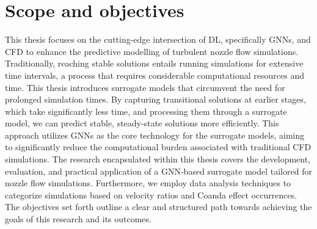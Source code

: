 \section{Scope and objectives}
This thesis focuses on the cutting-edge intersection of DL, specifically GNNs, and CFD to enhance the predictive modelling of turbulent nozzle flow simulations. Traditionally, reaching stable solutions entails running simulations for extensive time intervals, a process that requires considerable computational resources and time. This thesis introduces surrogate models that circumvent the need for prolonged simulation times. By capturing transitional solutions at earlier stages, which take significantly less time, and processing them through a surrogate model, we can predict stable, steady-state solutions more efficiently. This approach utilizes GNNs as the core technology for the surrogate models, aiming to significantly reduce the computational burden associated with traditional CFD simulations. The research encapsulated within this thesis covers the development, evaluation, and practical application of a GNN-based surrogate model tailored for nozzle flow simulations. Furthermore, we employ data analysis techniques to categorize simulations based on velocity ratios and Coanda effect occurrences. The objectives set forth outline a clear and structured path towards achieving the goals of this research and its outcomes.
